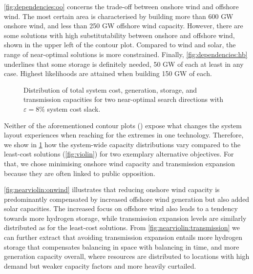 \cref{fig:dependencies:oo} concerns the trade-off between onshore wind and offshore wind.
The most certain area is characterised by building more than 600 GW onshore wind,
and less than 250 GW offshore wind capacity.
However, there are some solutions with high substitutability between onshore and offshore wind,
shown in the upper left of the contour plot.
Compared to wind and solar, the range of near-optimal solutions is more constrained.
Finally, \cref{fig:dependencies:hb} underlines that some storage is definitely needed,
50 GW of each at least in any case. Highest likelihoods are attained when building 150 GW of each.

\begin{figure}
    \noindent{}
    \caption{
      Distribution of total system cost, generation, storage, and transmission capacities
      for two near-optimal search directions with $\varepsilon=8\%$ system cost slack.
    }
    \label{fig:nearviolin}
\end{figure}

Neither of the aforementioned contour plots () expose
what changes the system layout experiences when reaching for the extremes in one technology.
Therefore, we show in \cref{fig:nearviolin} how the system-wide capacity distributions vary 
compared to the least-cost solutions (\cref{fig:violin}) for two exemplary alternative objectives.
For that, we chose minimising onshore wind capacity and transmission expansion
because they are often linked to public opposition.

\cref{fig:nearviolin:onwind} illustrates that reducing onshore wind capacity is
predominantly compensated by increased offshore wind generation but also added solar capacities.
The increased focus on offshore wind also leads to a tendency towards more hydrogen storage,
while transmission expansion levels are similarly distributed as for the least-cost solutions.
From \cref{fig:nearviolin:transmission} we can further extract that avoiding transmission expansion entails
more hydrogen storage that compensates balancing in space with balancing in time,
and more generation capacity overall, where resources are distributed to locations with
high demand but weaker capacity factors and more heavily curtailed.


